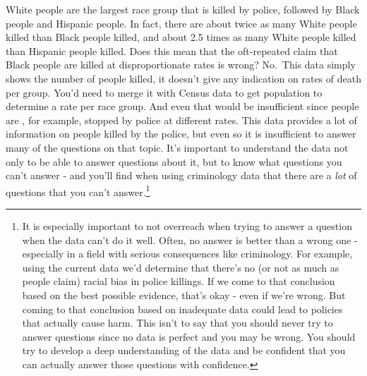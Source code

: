\documentclass[
  12pt,
]{book}
\newenvironment{Shaded}{\begin{snugshade}}{\end{snugshade}}
\newcommand{\CommentTok}[1]{\textcolor[rgb]{0.56,0.35,0.01}{\textit{#1}}}
\newcommand{\DataTypeTok}[1]{\textcolor[rgb]{0.13,0.29,0.53}{#1}}
\newcommand{\DecValTok}[1]{\textcolor[rgb]{0.00,0.00,0.81}{#1}}
\newcommand{\KeywordTok}[1]{\textcolor[rgb]{0.13,0.29,0.53}{\textbf{#1}}}
\newcommand{\NormalTok}[1]{#1}
\newcommand{\OperatorTok}[1]{\textcolor[rgb]{0.81,0.36,0.00}{\textbf{#1}}}
\newcommand{\StringTok}[1]{\textcolor[rgb]{0.31,0.60,0.02}{#1}}
\begin{document}
\begin{Shaded}
\end{Shaded}

White people are the largest race group that is killed by police, followed by Black people and Hispanic people. In fact, there are about twice as many White people killed than Black people killed, and about 2.5 times as many White people killed than Hispanic people killed. Does this mean that the oft-repeated claim that Black people are killed at disproportionate rates is wrong? No.~This data simply shows the number of people killed, it doesn't give any indication on rates of death per group. You'd need to merge it with Census data to get population to determine a rate per race group. And even that would be insufficient since people are , for example, stopped by police at different rates. This data provides a lot of information on people killed by the police, but even so it is insufficient to answer many of the questions on that topic. It's important to understand the data not only to be able to answer questions about it, but to know what questions you can't answer - and you'll find when using criminology data that there are a \emph{lot} of questions that you can't answer.\footnote{It is especially important to not overreach when trying to answer a question when the data can't do it well. Often, no answer is better than a wrong one - especially in a field with serious consequences like criminology. For example, using the current data we'd determine that there's no (or not as much as people claim) racial bias in police killings. If we come to that conclusion based on the best possible evidence, that's okay - even if we're wrong. But coming to that conclusion based on inadequate data could lead to policies that actually cause harm. This isn't to say that you should never try to answer questions since no data is perfect and you may be wrong. You should try to develop a deep understanding of the data and be confident that you can actually answer those questions with confidence.}
\end{document}

